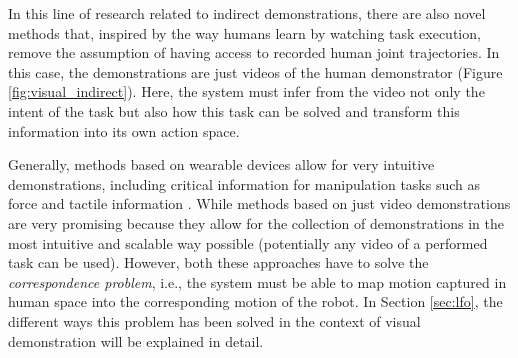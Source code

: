 In this line of research related to indirect demonstrations, there are also novel methods \cite{smith2019avid,torabi2019recent_advances_lfo,xiong2021learning_by_watching,wang2023mimicplay,qian2024contrast} that, inspired by the way humans learn by watching task execution, remove the assumption of having access to recorded human joint trajectories. In this case, the demonstrations are just videos of the human demonstrator (Figure \ref{fig:visual_indirect}). Here, the system must infer from the video not only the intent of the task but also how this task can be solved and transform this information into its own action space.

Generally, methods based on wearable devices allow for very intuitive demonstrations, including critical information for manipulation tasks such as force and tactile information \cite{liu2019_mirroring_without_overimitation}. While methods based on just video demonstrations are very promising because they allow for the collection of demonstrations in the most intuitive and scalable way possible (potentially any video of a performed task can be used). However, both these approaches have to solve the \textit{correspondence problem}, i.e., the system must be able to map motion captured in human space into the corresponding motion of the robot. In Section \ref{sec:lfo}, the different ways this problem has been solved in the context of visual demonstration will be explained in detail.


